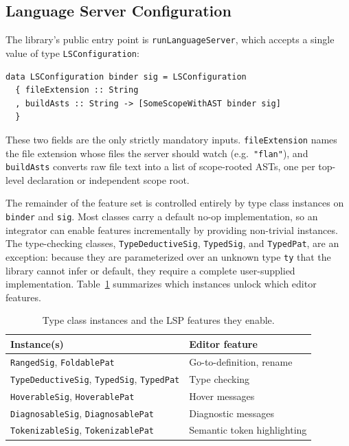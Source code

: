 \subsection{Language Server Configuration}

The library's public entry point is \texttt{runLanguageServer}, which accepts a single value of type \texttt{LSConfiguration}:

\begin{verbatim}
data LSConfiguration binder sig = LSConfiguration
  { fileExtension :: String
  , buildAsts :: String -> [SomeScopeWithAST binder sig]
  }
\end{verbatim}

These two fields are the only strictly mandatory inputs.
\texttt{fileExtension} names the file extension whose files the server should watch (e.g.\ \texttt{"flan"}), and \texttt{buildAsts} converts raw file text into a list of scope-rooted ASTs, one per top-level declaration or independent scope root.

The remainder of the feature set is controlled entirely by type class instances on \texttt{binder} and \texttt{sig}.
Most classes carry a default no-op implementation, so an integrator can enable features incrementally by providing non-trivial instances.
The type-checking classes, \texttt{TypeDeductiveSig}, \texttt{TypedSig}, and \texttt{TypedPat}, are an exception: because they are parameterized over an unknown type \texttt{ty} that the library cannot infer or default, they require a complete user-supplied implementation.
Table~\ref{tab:ls_features} summarizes which instances unlock which editor features.

\begin{table}[h]
\centering
\begin{tabular}{ll}
\hline
\textbf{Instance(s)} & \textbf{Editor feature} \\
\hline
\texttt{RangedSig}, \texttt{FoldablePat} & Go-to-definition, rename \\
\texttt{TypeDeductiveSig}, \texttt{TypedSig}, \texttt{TypedPat} & Type checking \\
\texttt{HoverableSig}, \texttt{HoverablePat} & Hover messages \\
\texttt{DiagnosableSig}, \texttt{DiagnosablePat} & Diagnostic messages \\
\texttt{TokenizableSig}, \texttt{TokenizablePat} & Semantic token highlighting \\
\hline
\end{tabular}
\caption{Type class instances and the LSP features they enable.}
\label{tab:ls_features}
\end{table}


